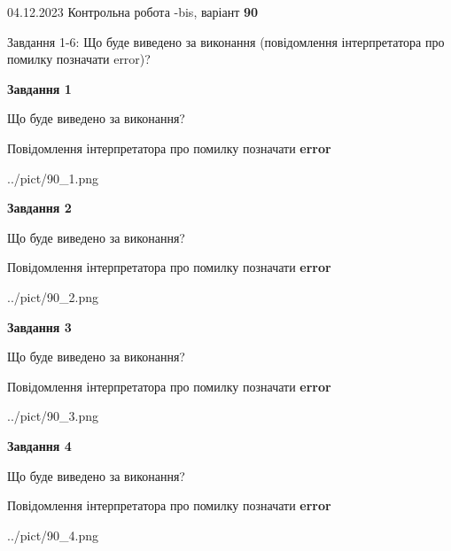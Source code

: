 \documentclass[12pt, ukrainian]{article}
\begin{document}
{{04.12.2023 Контрольна робота -bis, варіант  \No \textbf { 90 }\par}}
{

Завдання 1-6: Що буде виведено за виконання (повідомлення інтерпретатора про помилку позначати error)?


{\begin {center}\textbf{Завдання 1}\end {center}}\par
Що буде виведено за виконання? \par
Повідомлення інтерпретатора про помилку позначати \textbf{error}

\begin{center}
	{../pict/90_1.png}
\end{center}
\newpage

{\begin {center}\textbf{Завдання 2}\end {center}}\par
Що буде виведено за виконання? \par
Повідомлення інтерпретатора про помилку позначати \textbf{error}

\begin{center}
	{../pict/90_2.png}
\end{center}
\newpage

{\begin {center}\textbf{Завдання 3}\end {center}}\par
Що буде виведено за виконання? \par
Повідомлення інтерпретатора про помилку позначати \textbf{error}

\begin{center}
	{../pict/90_3.png}
\end{center}
\newpage

{\begin {center}\textbf{Завдання 4}\end {center}}\par
Що буде виведено за виконання? \par
Повідомлення інтерпретатора про помилку позначати \textbf{error}

\begin{center}
	{../pict/90_4.png}
\end{center}
\newpage

}
\end{document}
